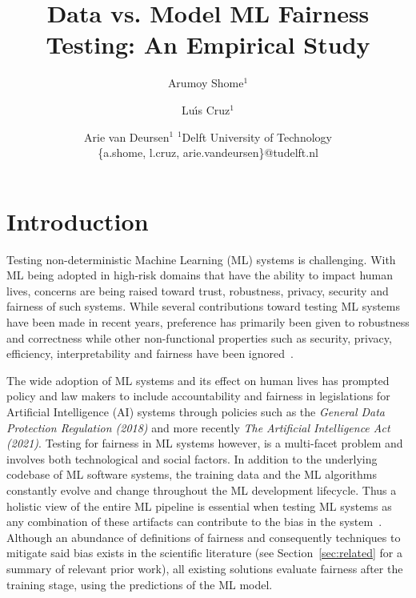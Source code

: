 \documentclass{article}
\title{Data vs. Model ML Fairness Testing: An Empirical Study}
\author{
  Arumoy Shome$^1$
  \and
  Lu{\'\i}s Cruz$^1$\and
  Arie van Deursen$^{1}$
  \affiliations
  $^1$Delft University of Technology\\
  \emails
  \{a.shome, l.cruz, arie.vandeursen\}@tudelft.nl
}
\begin{document}
\maketitle

\begin{abstract}
\end{abstract}

\section{Introduction}\label{sec:intro}


Testing non-deterministic Machine Learning (ML) systems is
challenging. With ML being adopted in high-risk domains that have the
ability to impact human lives, concerns are being raised toward trust,
robustness, privacy, security and fairness of such systems. While
several contributions toward testing ML systems have been made in
recent years, preference has primarily been given to robustness and
correctness while other non-functional properties such as security,
privacy, efficiency, interpretability and fairness have been
ignored \cite{zhang2020machine,zhang2021ignorance,mehrabi2021survey,wan2021modeling}.

The wide adoption of ML systems and its effect on human lives has
prompted policy and law makers to include accountability and fairness
in legislations for Artificial Intelligence (AI) systems through
policies such as the \emph{General Data Protection Regulation (2018)}
and more recently \emph{The Artificial Intelligence Act (2021)}.
Testing for fairness in ML systems however, is a multi-facet problem
and involves both technological and social factors. In addition to the
underlying codebase of ML software systems, the training data and the
ML algorithms constantly evolve and change throughout the ML
development lifecycle. Thus a holistic view of the entire ML pipeline
is essential when testing ML systems as any combination of these
artifacts can contribute to the bias in the
system \cite{sculley2015hidden,bosch2021engineering,hutchinson2021towards,sato2019continuous}.
Although an abundance of definitions of fairness and consequently
techniques to mitigate said bias exists in the scientific literature
(see Section \ref{sec:related} for a summary of relevant prior work),
all existing solutions evaluate fairness after the training stage,
using the predictions of the ML model.
\end{document}
